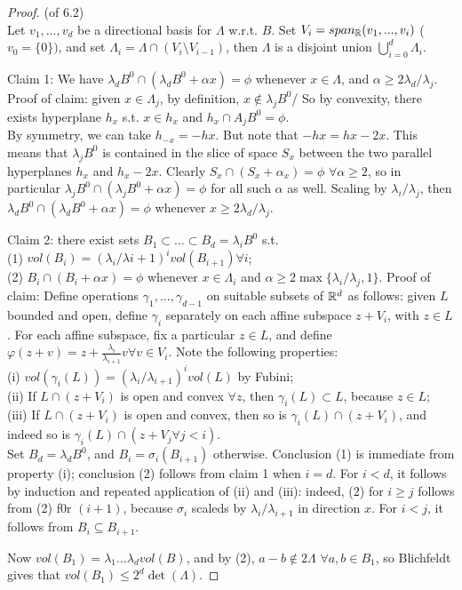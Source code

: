 \documentclass[a4paper]{article}
\begin{document}
\begin{proof} (of 6.2)\\
    Let $v_1,...,v_d$ be a directional basis for $\Lambda$ w.r.t. $B$. Set $V_i = span_{\mathbb{R}} (v_1,...,v_i)$ ($v_0 = \{0\})$, and set $\Lambda_i = \Lambda \cap (V_i \setminus V_{i-1})$, then $\Lambda$ is a disjoint union $\bigcup_{i=0}^d \Lambda_i$.

    Claim 1: We have $\lambda_d B^0 \cap (\lambda_d B^0 + \alpha x) = \phi$ whenever $x \in \Lambda$, and $\alpha \geq 2\lambda_d / \lambda_j$.\\
    Proof of claim: given $x \in \Lambda_j$, by definition, $x \not\in \lambda_j B^0$/ So by convexity, there exists hyperplane $h_x$ s.t. $x \in h_x$ and $h_x \cap A_j B^0 = \phi$.\\
    By symmetry, we can take $h_{-x} = -hx$. But note that $-hx = hx - 2x$. This means that $\lambda_j B^0$ is contained in the slice of space $S_x$ between the two parallel hyperplanes $h_x$ and $h_x-2x$. Clearly $S_x \cap (S_x + \alpha_x) = \phi$ $\forall \alpha \geq 2$, so in particular $\lambda_j B^0 \cap (\lambda_j B^0 + \alpha x) = \phi$ for all such $\alpha$ as well. Scaling by $\lambda_i/\lambda_j$, then $\lambda_d B^0 \cap (\lambda_d B^0 + \alpha x) = \phi$ whenever $x \geq 2\lambda_d / \lambda_j$.

    Claim 2: there exist sets $B_1 \subset ... \subset B_d = \lambda_i B^0$ s.t. \\
    (1) $vol(B_i) = (\lambda_i/{\lambda{i+1}})^i vol(B_{i+1}) \forall i$;\\
    (2) $B_i \cap (B_i + \alpha x) = \phi$ whenever $x \in \Lambda_i$ and $\alpha \geq 2 \max\{\lambda_i/\lambda_j,1\}$.
    Proof of claim: Define operations $\gamma_1,...,\gamma_{d-1}$ on suitable subsets of $\mathbb{R}^d$ as follows:  given $L$ bounded and open, define $\gamma_i$ separately on each affine subspace $z+V_i$, with $z \in L$. For each affine subspace, fix a particular $z \in L$, and define $\varphi(z+v) = z+\frac{\lambda_i}{\lambda_{i+1}} v \forall v \in V_i$. Note the following properties:\\
    (i) $vol(\gamma_i(L)) = (\lambda_i/\lambda_{i+1})^i vol(L)$ by Fubini;\\
    (ii) If $L \cap (z+V_i)$ is open and convex $\forall z$, then $\gamma_i(L) \subset L$, because $z \in L$;\\
    (iii) If $L \cap (z+V_i)$ is open and convex, then so is $\gamma_i(L) \cap (z+V_i)$, and indeed so is $\gamma_i(L) \cap (z+V_j \forall j < i)$.\\
    Set $B_d = \lambda_d B^0$, and $B_i = \sigma_i (B_{i+1})$ otherwise. Conclusion (1) is immediate from property (i); conclusion (2) follows from claim 1 when $i=d$. For $i<d$, it follows by induction and repeated application of (ii) and (iii): indeed, (2) for $i \geq j$ follows from (2) f0r $(i+1)$, because $\sigma_i$ scaleds by $\lambda_i/\lambda_{i+1}$ in direction $x$. For $i<j$, it follows from $B_i \subseteq B_{i+1}$.

    Now $vol(B_1) = \lambda_1...\lambda_d vol(B)$, and by (2), $a-b \not\in 2\Lambda$ $\forall a,b \in B_1$, so Blichfeldt gives that $vol(B_1) \leq 2^d \det(\Lambda)$.
\end{proof}
\end{document}
